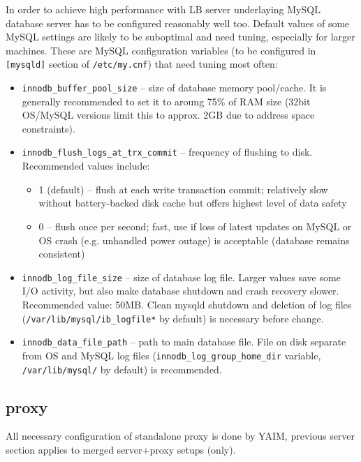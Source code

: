 In order to achieve high performance with LB server underlaying MySQL 
database server has to be configured reasonably well too. 
Default values of some MySQL settings are likely to be suboptimal
and need tuning, especially for larger machines.
These are MySQL configuration variables (to be configured in \texttt{[mysqld]} 
section of \texttt{/etc/my.cnf}) that need tuning most often:
\begin{itemize}
\item \texttt{innodb\_buffer\_pool\_size} -- size of database memory pool/cache. 
It is generally recommended to set it to aroung 75\% of RAM size
(32bit OS/MySQL versions limit this to approx. 2GB due to address space 
constraints).

\item \texttt{innodb\_flush\_logs\_at\_trx\_commit} -- frequency of flushing to disk.
Recommended values include:
\begin{itemize}
\item 1 (default) -- flush at each write transaction commit; relatively
slow without battery-backed disk cache but offers highest level of data safety
\item 0 -- flush once per second; fast, use if loss of latest updates on MySQL
or OS crash (e.g. unhandled power outage) is acceptable (database remains consistent)
\end{itemize}

\item \texttt{innodb\_log\_file\_size} -- size of database log file. Larger values
save some I/O activity, but also make database shutdown and crash recovery slower.
Recommended value: 50MB. Clean mysqld shutdown and deletion of log files 
(\texttt{/var/lib/mysql/ib\_logfile*} by default) is necessary before change.

\item \texttt{innodb\_data\_file\_path} -- path to main database file. File on
disk separate from OS and MySQL log files (\texttt{innodb\_log\_group\_home\_dir} variable,
\texttt{/var/lib/mysql/} by default) is recommended.

\end{itemize}

\subsection{\LB proxy}

All necessary configuration of standalone \LB proxy is done by YAIM,
previous \LB server section applies to merged server+proxy setups (\LBnew only).

